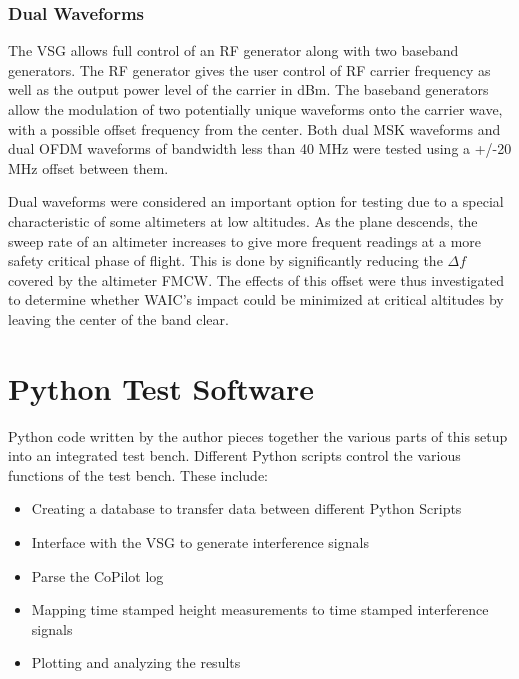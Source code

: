 \subsubsection{Dual Waveforms}\label{subsub:Dual}
The VSG allows full control of an RF generator along with two baseband generators. The RF generator gives the user control of RF carrier frequency as well as the output power level of the carrier in dBm. The baseband generators allow the modulation of two potentially unique waveforms onto the carrier wave, with a possible offset frequency from the center. Both dual MSK waveforms and dual OFDM waveforms of bandwidth less than 40 MHz were tested using a +/-20 MHz offset between them. 

Dual waveforms were considered an important option for testing due to a special characteristic of some altimeters at low altitudes. As the plane descends, the sweep rate of an altimeter increases to give more frequent readings at a more safety critical phase of flight. This is done by significantly reducing the $\Delta f$ covered by the altimeter FMCW. The effects of this offset were thus investigated to determine whether WAIC's impact could be minimized at critical altitudes by leaving the center of the band clear. 


\section{Python Test Software}\label{sec:Python}
Python code written by the author pieces together the various parts of this setup into an integrated test bench. Different Python scripts control the various functions of the test bench. These include:

\begin{itemize}
\item Creating a database to transfer data between different Python Scripts
\item Interface with the VSG to generate interference signals
\item Parse the CoPilot log
\item Mapping time stamped height measurements to time stamped interference signals
\item Plotting and analyzing the results
\end{itemize}

